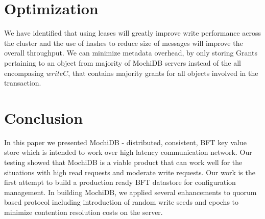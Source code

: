 \documentclass[letterpaper,twocolumn,10pt]{article}
\begin{document}
\section{Optimization}
We have identified that using leases will greatly improve write performance across the cluster and the use of hashes to reduce size of messages will improve the overall throughput. We can minimize metadata overhead, by only storing Grants pertaining to an object from majority of MochiDB servers instead of the all encompasing $writeC$, that contains majority grants for all objects involved in the transaction.

\section{Conclusion}
In this paper we presented MochiDB - distributed, consistent, BFT key value store which is intended to work over high latency communication network. Our testing showed that MochiDB is a viable product that can work well for the situations with high read requests and moderate write requests. Our work is the first attempt to build a production ready BFT datastore for configuration management. In building MochiDB, we applied several enhancements to quorum based protocol including introduction of random write seeds and epochs to minimize contention resolution costs on the server.

{\footnotesize 
}
\end{document}
